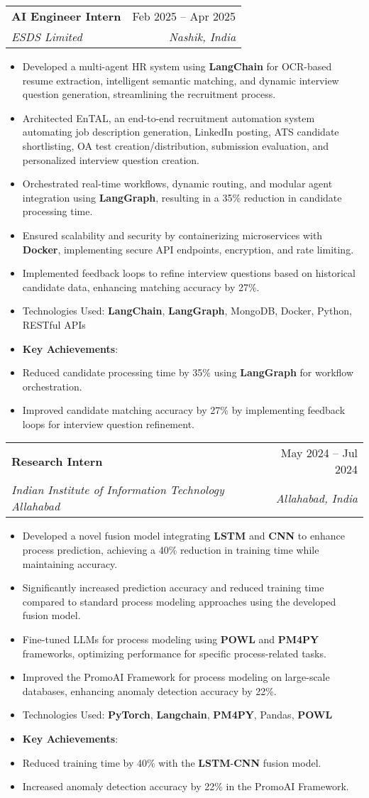 \documentclass[letterpaper,11pt]{article}
\makeatletter
\newcommand{\resumeItem}[1]{
  \item\small{
    {#1 \vspace{-2pt}}
  }
}
\newcommand{\resumeSubheading}[4]{
  \vspace{-2pt}\item
    \begin{tabular*}{0.97\textwidth}[t]{l@{\extracolsep{\fill}}r}
      \textbf{#1} & #2 \\
      \textit{\small#3} & \textit{\small #4} \\
    \end{tabular*}\vspace{-7pt}
}
\newcommand{\resumeItemListStart}{\begin{itemize}}
\newcommand{\resumeItemListEnd}{\end{itemize}\vspace{-5pt}}
\makeatother
\begin{document}
    \resumeSubheading
      {AI Engineer Intern}{Feb 2025 -- Apr 2025}
      {ESDS Limited}{Nashik, India}
      \resumeItemListStart
        \resumeItem{Developed a multi-agent HR system using \textbf{LangChain} for OCR-based resume extraction, intelligent semantic matching, and dynamic interview question generation, streamlining the recruitment process.}
        \resumeItem{Architected EnTAL, an end-to-end recruitment automation system automating job description generation, LinkedIn posting, ATS candidate shortlisting, OA test creation/distribution, submission evaluation, and personalized interview question creation.}
        \resumeItem{Orchestrated real-time workflows, dynamic routing, and modular agent integration using \textbf{LangGraph}, resulting in a 35\% reduction in candidate processing time.}
        \resumeItem{Ensured scalability and security by containerizing microservices with \textbf{Docker}, implementing secure API endpoints, encryption, and rate limiting.}
        \resumeItem{Implemented feedback loops to refine interview questions based on historical candidate data, enhancing matching accuracy by 27\%.}
        \resumeItem{Technologies Used: \textbf{LangChain}, \textbf{LangGraph}, MongoDB, Docker, Python, RESTful APIs}
        \resumeItem{\textbf{Key Achievements}:}
        \resumeItem{Reduced candidate processing time by 35\% using \textbf{LangGraph} for workflow orchestration.}
        \resumeItem{Improved candidate matching accuracy by 27\% by implementing feedback loops for interview question refinement.}
      \resumeItemListEnd

    \resumeSubheading
      {Research Intern}{May 2024 -- Jul 2024}
      {Indian Institute of Information Technology Allahabad}{Allahabad, India}
      \resumeItemListStart
        \resumeItem{Developed a novel fusion model integrating \textbf{LSTM} and \textbf{CNN} to enhance process prediction, achieving a 40\% reduction in training time while maintaining accuracy.}
        \resumeItem{Significantly increased prediction accuracy and reduced training time compared to standard process modeling approaches using the developed fusion model.}
        \resumeItem{Fine-tuned LLMs for process modeling using \textbf{POWL} and \textbf{PM4PY} frameworks, optimizing performance for specific process-related tasks.}
        \resumeItem{Improved the PromoAI Framework for process modeling on large-scale databases, enhancing anomaly detection accuracy by 22\%.}
        \resumeItem{Technologies Used: \textbf{PyTorch}, \textbf{Langchain}, \textbf{PM4PY}, Pandas, \textbf{POWL}}
        \resumeItem{\textbf{Key Achievements}:}
        \resumeItem{Reduced training time by 40\% with the \textbf{LSTM}-\textbf{CNN} fusion model.}
        \resumeItem{Increased anomaly detection accuracy by 22\% in the PromoAI Framework.}
      \resumeItemListEnd
\end{document}
